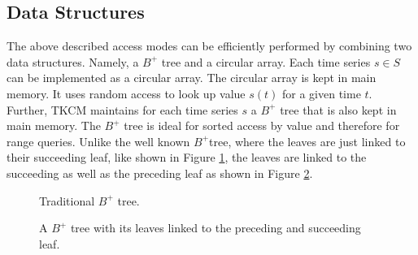 \documentclass[abstracton,12pt]{scrreprt}
\begin{document}
\subsection{Data Structures}
The above described access modes can be efficiently performed by combining two data structures. Namely, a $B^+$ tree and a circular array. Each time series $s \in S$ can be implemented as a circular array. The circular array is kept in main memory. It uses random access to look up value $s(t)$ for a given time $t$. Further, TKCM maintains for each time series $s$ a $B^+$ tree that is also kept in main memory. The $B^+$ tree is ideal for sorted access by value and therefore for range queries. Unlike the well known $B^+$tree, where the leaves are just linked to their succeeding leaf, like shown in Figure \ref{fig:tratree}, the leaves are linked to the succeeding as well as the preceding leaf as shown in Figure \ref{fig:sptree}. 
\begin{figure} 
\begin{center}
\end{center}
	\caption{Traditional $B^+$ tree.}
	\label{fig:tratree}
\end{figure}
\begin{figure} 
\begin{center}
\end{center}
	\caption{A $B^+$ tree with its leaves linked to the preceding and succeeding leaf.}
	\label{fig:sptree}
\end{figure}
\end{document}
